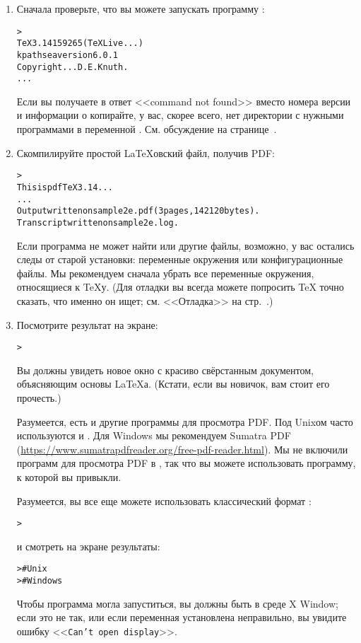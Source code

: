 \documentclass{article}
\renewcommand{\samp}[1]{<<\texttt{#1}>>}
\begin{document}
\begin{enumerate}

\item Сначала проверьте, что вы можете запускать программу
  :

\begin{alltt}
> 
TeX 3.14159265 (TeX Live ...)
kpathsea version 6.0.1
Copyright ... D.E. Knuth.
...
\end{alltt}
Если вы получаете в ответ <<command not found>> вместо номера версии и
информации о копирайте, у вас, скорее всего, нет директории с нужными
программами в переменной .  См. обсуждение на
странице~\pageref{sec:env}.


\item Скомпилируйте простой  \LaTeX{}овский файл, получив PDF:
\begin{alltt}
> 
This is pdfTeX 3.14...
...
Output written on sample2e.pdf (3 pages, 142120 bytes).
Transcript written on sample2e.log.
\end{alltt}
Если программа не может найти  или другие
файлы, возможно, у вас остались следы от старой установки: переменные
окружения или конфигурационные файлы.  Мы рекомендуем сначала убрать
все переменные окружения, относящиеся к \TeX у. (Для отладки вы всегда можете
попросить \TeX{} точно сказать, что именно он ищет; см. <<Отладка>> на
стр.~\pageref{sec:debugging}.)

\item Посмотрите результат на экране:
\begin{alltt}
>  
\end{alltt}
Вы должны увидеть новое окно с красиво свёрстанным документом,
объясняющим основы \LaTeX{}а.  (Кстати, если вы новичок, вам
стоит его прочесть.)  

Разумеется, есть и другие программы для просмотра PDF.  Под Unixом
часто используются  и .  Для Windows
мы рекомендуем Sumatra PDF
(\url{https://www.sumatrapdfreader.org/free-pdf-reader.html}).  Мы не
включили программ для просмотра PDF в \TL, так что вы можете
использовать программу, к которой вы привыкли.  

Разумеется, вы все еще можете использовать классический формат \dvi{}:
\begin{alltt}
> 
\end{alltt}
и смотреть на экране результаты:
\begin{alltt}
>     # Unix
>   # Windows
\end{alltt}
Чтобы программа  могла запуститься, вы должны быть в
среде X Window; если это не так, или если переменная 
установлена неправильно, вы увидите ошибку \samp{Can't open display}.


\end{enumerate}
\end{document}
